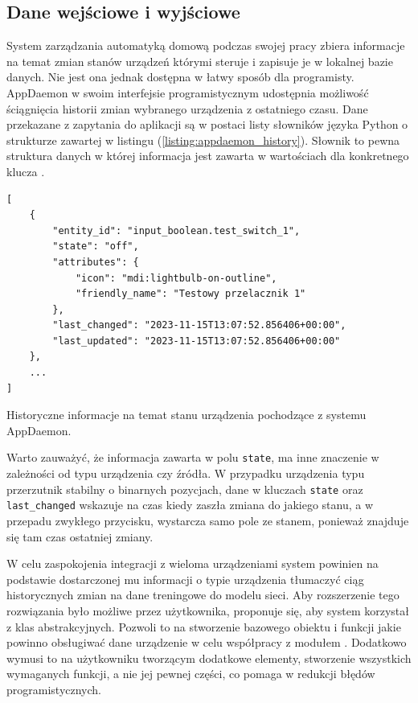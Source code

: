 \subsection{Dane wejściowe i wyjściowe}
System zarządzania automatyką domową podczas swojej pracy zbiera informacje na temat zmian stanów urządzeń którymi steruje i zapisuje je w lokalnej bazie danych. Nie jest ona jednak dostępna w łatwy sposób dla programisty. AppDaemon w swoim interfejsie programistycznym udostępnia możliwość ściągnięcia historii zmian wybranego urządzenia z ostatniego czasu. Dane przekazane z zapytania do aplikacji są w postaci listy słowników języka Python o strukturze zawartej w listingu (\ref{listing:appdaemon_history}). Słownik to pewna struktura danych w której informacja jest zawarta w wartościach dla konkretnego klucza \cite{book:learning_python}.

\begin{listing}
\begin{verbatim}
[
    {
        "entity_id": "input_boolean.test_switch_1",
        "state": "off",
        "attributes": {
            "icon": "mdi:lightbulb-on-outline",
            "friendly_name": "Testowy przelacznik 1"
        },
        "last_changed": "2023-11-15T13:07:52.856406+00:00",
        "last_updated": "2023-11-15T13:07:52.856406+00:00"
    },
    ...
]
\end{verbatim}
\caption{Historyczne informacje na temat stanu urządzenia pochodzące z systemu AppDaemon.} \label{listing:appdaemon_history}
\end{listing}

Warto zauważyć, że informacja zawarta w polu \verb+state+, ma inne znaczenie w zależności od typu urządzenia czy źródła. W przypadku urządzenia typu przerzutnik stabilny o binarnych pozycjach, dane w kluczach \verb+state+ oraz \verb+last_changed+ wskazuje na czas kiedy zaszła zmiana do jakiego stanu, a w przepadu zwykłego przycisku, wystarcza samo pole ze stanem, ponieważ znajduje się tam czas ostatniej zmiany.

W celu zaspokojenia integracji z wieloma urządzeniami system powinien na podstawie dostarczonej mu informacji o typie urządzenia tłumaczyć ciąg historycznych zmian na dane treningowe do modelu sieci. Aby rozszerzenie tego rozwiązania było możliwe przez użytkownika, proponuje się, aby system korzystał z klas abstrakcyjnych. Pozwoli to na stworzenie bazowego obiektu i funkcji jakie powinno obsługiwać dane urządzenie w celu współpracy z modułem \cite{book:czysty_kod}. Dodatkowo wymusi to na użytkowniku tworzącym dodatkowe elementy, stworzenie wszystkich wymaganych funkcji, a nie jej pewnej części, co pomaga w redukcji błędów programistycznych.


